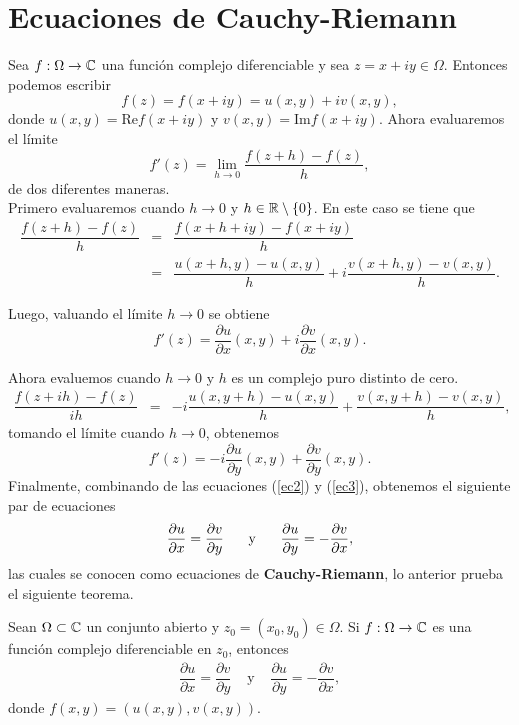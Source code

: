 \section{Ecuaciones de Cauchy-Riemann} \label{sec:Cauchy-Riemann}

Sea $f:\Omega\rightarrow\mathbb{C}$ una función complejo diferenciable y sea $z=x+iy\in \Omega$. Entonces podemos escribir
$$f(z)=f(x+iy)=u(x,y)+iv(x,y),$$
donde $u(x,y)=\mathrm{Re } f(x+iy)$ y $v(x,y)=\mathrm{Im } f(x+iy)$. Ahora evaluaremos el límite 
$$f'(z)=\lim_{h\rightarrow 0}\dfrac{f(z+h)-f(z)}{h},$$
de dos diferentes maneras.\\
Primero evaluaremos cuando $h\rightarrow 0$ y $h\in \mathbb{R}\setminus\{0\}$. En este caso  se tiene que
\[
\begin{array}{ccl}
	\dfrac{f(z+h)-f(z)}{h}&=&\dfrac{f(x+h+iy)-f(x+iy)}{h}\\
	&=&\dfrac{u(x+h,y)-u(x,y)}{h}+i\dfrac{v(x+h,y)-v(x,y)}{h}.
\end{array}
\]

Luego, valuando el límite $h\rightarrow 0$ se obtiene
\begin{equation}\label{ec2}
	f'(z)=\dfrac{\partial u}{\partial x}(x,y)+i\dfrac{\partial v}{\partial x}(x,y).
\end{equation}

Ahora evaluemos cuando $h\rightarrow 0$ y $h$ es un complejo puro distinto de cero. 
\[
\begin{array}{ccl}
	\dfrac{f(z+ih)-f(z)}{ih}&=&-i\dfrac{u(x,y+h)-u(x,y)}{h}+\dfrac{v(x,y+h)-v(x,y)}{h},
\end{array}
\]
tomando el límite cuando $h\rightarrow 0$, obtenemos  
\begin{equation}\label{ec3}
	f'(z)=-i\dfrac{\partial u}{\partial{y}}(x,y)+\dfrac{\partial v}{\partial y}(x,y).
\end{equation}
Finalmente, combinando de las ecuaciones (\ref{ec2}) y (\ref{ec3}), obtenemos el siguiente par de ecuaciones 
\begin{equation}
	\dfrac{\partial u}{\partial x} = \dfrac{\partial v}{\partial y}\hspace{0.5 cm} \mbox{ y } \hspace{0.5 cm} \dfrac{\partial u}{\partial y} =- \dfrac{\partial v}{\partial x},
\end{equation}
las cuales se conocen como ecuaciones de \textbf{Cauchy-Riemann}, lo anterior prueba el siguiente teorema.

\begin{teor}\label{teo3}
		Sean $\Omega\subset \mathbb{C}$ un conjunto abierto y $z_{0}=(x_{0},y_{0}) \in \Omega$. Si $f:\Omega\rightarrow\mathbb{C}$ es una función complejo diferenciable  en $z_{0}$, entonces
		\[
			\begin{array}{ccl}
				\dfrac{\partial u}{\partial x} = \dfrac{\partial v}{\partial y} &\mbox{ y } & \dfrac{\partial u}{\partial y} =-\dfrac{\partial v}{\partial x},
			\end{array}
		\]
		donde $f(x,y)=(u(x,y),v(x,y))$.
\end{teor}



